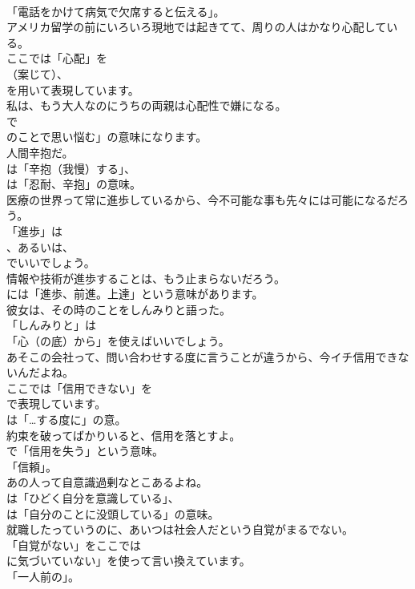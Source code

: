 \documentclass[8pt]{extreport}
\begin{document}
\begin{CJK}{UTF8}{min}
\\	「電話をかけて病気で欠席すると伝える」。	
\\	アメリカ留学の前にいろいろ現地では起きてて、周りの人はかなり心配している。 
\\	ここでは「心配」を 
\\	（案じて）、
\\	を用いて表現しています。	
\\	私は、もう大人なのにうちの両親は心配性で嫌になる。 
\\	で
\\	のことで思い悩む」の意味になります。	
\\	人間辛抱だ。 
\\	は「辛抱（我慢）する」、
\\	は「忍耐、辛抱」の意味。	
\\	医療の世界って常に進歩しているから、今不可能な事も先々には可能になるだろう。 
\\	「進歩」は
\\	、あるいは、
\\	でいいでしょう。	
\\	情報や技術が進歩することは、もう止まらないだろう。 
\\	には「進歩、前進。上達」という意味があります。	
\\	彼女は、その時のことをしんみりと語った。 
\\	「しんみりと」は
\\	「心（の底）から」を使えばいいでしょう。	
\\	あそこの会社って、問い合わせする度に言うことが違うから、今イチ信用できないんだよね。 
\\	ここでは「信用できない」を 
\\	で表現しています。
\\	は「…する度に」の意。	
\\	約束を破ってばかりいると、信用を落とすよ。 
\\	で「信用を失う」という意味。
\\	「信頼」。	
\\	あの人って自意識過剰なとこあるよね。 
\\	は「ひどく自分を意識している」、
\\	は「自分のことに没頭している」の意味。	
\\	就職したっていうのに、あいつは社会人だという自覚がまるでない。 
\\	「自覚がない」をここでは
\\	に気づいていない」を使って言い換えています。
\\	「一人前の」。	

\end{CJK}
\end{document}

